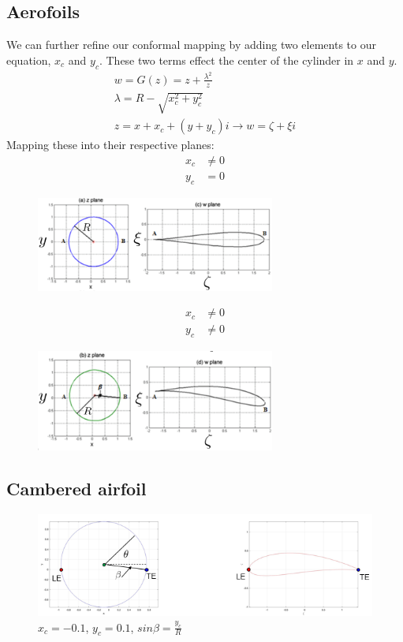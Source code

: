 \documentclass[class=report, crop=false, 12pt,a4paper]{standalone}
\begin{document}
\subsection{Aerofoils}
We can further refine our conformal mapping by adding two elements to our equation, $x_c$ and $y_c$. These two terms effect the center of the cylinder in $x$ and $y$. 
\begin{gather}
  w = G(z) = z + \frac{\lambda^2}{z}\\
  \lambda = R - \sqrt{x_c^2 + y_c^2}\\
  z = x + x_c + (y + y_c)i \rightarrow w = \zeta + \xi i
\end{gather}
Mapping these into their respective planes:
\begin{align}
  x_c &\neq 0\\
  y_c &= 0
\end{align}
\begin{figure}[H]
  \centering
  \includegraphics[width = 0.7\textwidth]{../img/diagram35.png}
\end{figure}
\begin{align}
  x_c &\neq 0\\
  y_c &\neq 0 
\end{align}
\begin{figure}[H]
  \centering
  \includegraphics[width = 0.7\textwidth]{../img/diagram36.png}
\end{figure}
\subsection{Cambered airfoil}
\begin{figure}[H]
  \centering
  \includegraphics[width = \textwidth]{../img/diagram44.png}
  \caption{$x_c = -0.1$, $y_c = 0.1$, $sin{\beta} = \frac{y_c}{R}$}
\end{figure}
\end{document}
